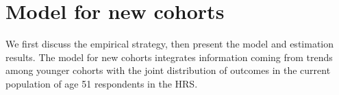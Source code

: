 \section{Model for new cohorts}
We first discuss the empirical strategy, then present the model and estimation results. The model for new cohorts integrates information 
coming from trends among younger cohorts with the joint distribution of outcomes in the current population of age 51 respondents in the 
HRS.


